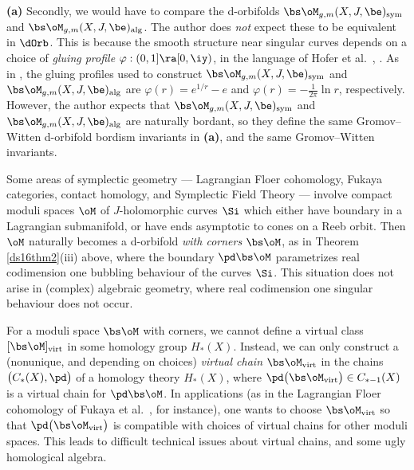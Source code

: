 \documentclass{article}
\begin{document}
\begin{rem}{\bf(a)}
Secondly, we would have to compare the d-orbifolds
$\bs\oM_{g,m}(X,J,\be)_{\rm sym}$ and $\bs\oM_{g,m}(X,J,\be)_{\rm
alg}$. The author does {\it not\/} expect these to be equivalent in
$\dOrb$. This is because the smooth structure near singular curves
depends on a choice of {\it gluing profile\/} $\varphi:(0,1]\ra[0,\iy)$, in
the language of Hofer et al.\ \cite[\S 4.2]{HWZ5}, \cite[\S
2.1]{HWZ6}. As in \cite[\S 2.1]{HWZ6}, the gluing profiles used to
construct $\bs\oM_{g,m}(X,J,\be)_{\rm sym}$ and
$\bs\oM_{g,m}(X,J,\be)_{\rm alg}$ are $\varphi(r)=e^{1/r}-e$ and
$\varphi(r)=-\frac{1}{2\pi}\ln r$, respectively. However, the author
expects that $\bs\oM_{g,m}(X,J,\be)_{\rm sym}$ and
$\bs\oM_{g,m}(X,J,\be)_{\rm alg}$ are naturally bordant, so they
define the same Gromov--Witten d-orbifold bordism invariants in
{\bf(a)}, and the same Gromov--Witten invariants.
\smallskip

 Some areas of symplectic geometry --- Lagrangian
Floer cohomology, Fukaya
categories, contact homology, and Symplectic Field Theory ---
involve compact moduli spaces $\oM$ of $J$-holomorphic curves $\Si$
which either have boundary in a Lagrangian submanifold, or have ends asymptotic to cones on a Reeb orbit. Then
$\oM$ naturally becomes a d-orbifold {\it with corners\/} $\bs\oM$,
as in Theorem \ref{ds16thm2}(iii) above, where the boundary
$\pd\bs\oM$ parametrizes real codimension one bubbling behaviour of
the curves $\Si$. This situation does not arise in (complex)
algebraic geometry, where real codimension one singular behaviour
does not occur.

For a moduli space $\bs\oM$ with corners, we cannot define a virtual
class $[\bs\oM]_{\rm virt}$ in some homology group $H_*(X)$.
Instead, we can only construct a (nonunique, and depending on
choices) {\it virtual chain\/} $\bs\oM_{\rm virt}$
in the chains $\bigl(C_*(X),\pd\bigr)$ of a homology theory
$H_*(X)$, where $\pd\bigl(\bs\oM_{\rm virt}\bigr)\in C_{*-1}(X)$ is
a virtual chain for $\pd\bs\oM$. In applications (as in the
Lagrangian Floer cohomology of Fukaya et al.\ \cite{FOOO}, for
instance), one wants to choose $\bs\oM_{\rm virt}$ so that
$\pd\bigl(\bs\oM_{\rm virt}\bigr)$ is compatible with choices of
virtual chains for other moduli spaces. This leads to difficult
technical issues about virtual chains, and some ugly homological
algebra.


\end{rem}
\end{document}
